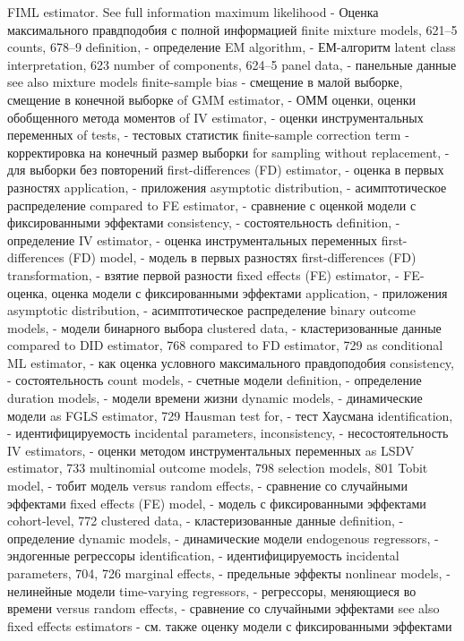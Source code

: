 FIML estimator. See full information maximum likelihood - Оценка максимального правдподобия с полной информацией
finite mixture models, 621–5
counts, 678–9
definition, - определение
EM algorithm, - ЕМ-алгоритм
latent class interpretation, 623 
number of components, 624–5 
panel data, - панельные данные
see also mixture models
finite-sample bias - смещение в малой выборке, смещение в конечной выборке
of GMM estimator, - ОММ оценки, оценки обобщенного метода моментов
of IV estimator, - оценки инструментальных переменных
of tests, - тестовых статистик
finite-sample correction term - корректировка на конечный размер выборки
for sampling without replacement, - для выборки без повторений
first-differences (FD) estimator, - оценка в первых разностях
application, - приложения
asymptotic distribution, - асимптотическое распределение
compared to FE estimator, - сравнение с оценкой модели с фиксированными эффектами
consistency, - состоятельность
definition, - определение
IV estimator, - оценка инструментальных переменных
first-differences (FD) model, - модель в первых разностях
first-differences (FD) transformation, - взятие первой разности
fixed effects (FE) estimator, - FE-оценка, оценка модели с фиксированными эффектами
application, - приложения
asymptotic distribution, - асимптотическое распределение
binary outcome models, - модели бинарного выбора
clustered data, - кластеризованные данные
compared to DID estimator, 768
compared to FD estimator, 729
as conditional ML estimator, - как оценка условного максимального правдоподобия
consistency, - состоятельность
count models, - счетные модели
definition, - определение
duration models, - модели времени жизни
dynamic models, - динамические модели 
as FGLS estimator, 729
Hausman test for, - тест Хаусмана
identification, - идентифицируемость
incidental parameters,
inconsistency, - несостоятельность 
IV estimators, - оценки методом инструментальных переменных
as LSDV estimator, 733 
multinomial outcome models, 798 selection models, 801
Tobit model, - тобит модель
versus random effects, - сравнение со случайными эффектами
fixed effects (FE) model, - модель с фиксированными эффектами
cohort-level, 772
clustered data, - кластеризованные данные
definition, - определение
dynamic models, - динамические модели 
endogenous regressors, - эндогенные регрессоры
identification, - идентифицируемость
incidental parameters, 704, 726
marginal effects, - предельные эффекты
nonlinear models, - нелинейные модели 
time-varying regressors, - регрессоры, меняющиеся во времени
versus random effects, - сравнение со случайными эффектами
see also fixed effects estimators - см. также оценку модели с фиксированными эффектами

